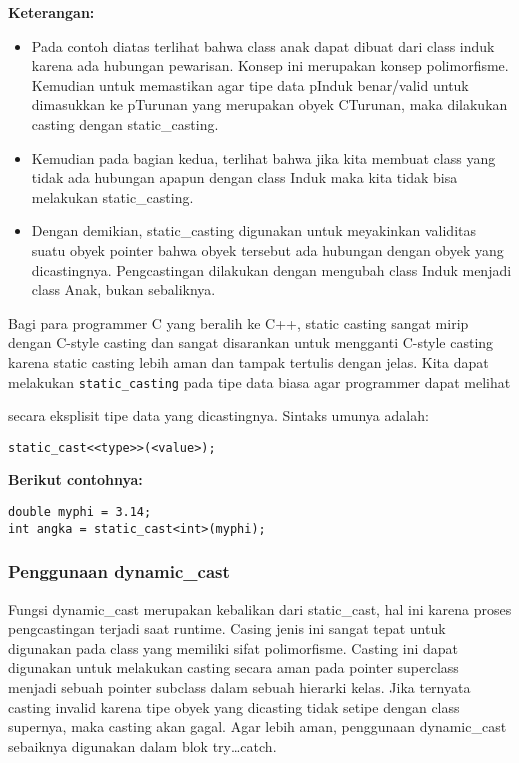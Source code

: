 \textbf{Keterangan:}

\begin{itemize}
\tightlist
\item
  Pada contoh diatas terlihat bahwa class anak dapat dibuat dari class
  induk karena ada hubungan pewarisan. Konsep ini merupakan konsep
  polimorfisme. Kemudian untuk memastikan agar tipe data pInduk
  benar/valid untuk dimasukkan ke pTurunan yang merupakan obyek
  CTurunan, maka dilakukan casting dengan static\_casting.
\item
  Kemudian pada bagian kedua, terlihat bahwa jika kita membuat class
  yang tidak ada hubungan apapun dengan class Induk maka kita tidak bisa
  melakukan static\_casting.
\item
  Dengan demikian, static\_casting digunakan untuk meyakinkan validitas
  suatu obyek pointer bahwa obyek tersebut ada hubungan dengan obyek
  yang dicastingnya. Pengcastingan dilakukan dengan mengubah class Induk
  menjadi class Anak, bukan sebaliknya.
\end{itemize}

Bagi para programmer C yang beralih ke C++, static casting sangat mirip
dengan C-style casting dan sangat disarankan untuk mengganti C-style
casting karena static casting lebih aman dan tampak tertulis dengan
jelas. Kita dapat melakukan \texttt{static\_casting} pada tipe data
biasa agar programmer dapat melihat

secara eksplisit tipe data yang dicastingnya. Sintaks umunya adalah:

\begin{verbatim}
static_cast<<type>>(<value>);
\end{verbatim}

\textbf{Berikut contohnya:}

\begin{verbatim}
double myphi = 3.14;
int angka = static_cast<int>(myphi);
\end{verbatim}

\subsubsection{Penggunaan
dynamic\_cast}\label{penggunaan-dynamicux5fcast}

Fungsi dynamic\_cast merupakan kebalikan dari static\_cast, hal ini
karena proses pengcastingan terjadi saat runtime. Casing jenis ini
sangat tepat untuk digunakan pada class yang memiliki sifat
polimorfisme. Casting ini dapat digunakan untuk melakukan casting secara
aman pada pointer superclass menjadi sebuah pointer subclass dalam
sebuah hierarki kelas. Jika ternyata casting invalid karena tipe obyek
yang dicasting tidak setipe dengan class supernya, maka casting akan
gagal. Agar lebih aman, penggunaan dynamic\_cast sebaiknya digunakan
dalam blok try\ldots{}catch.

